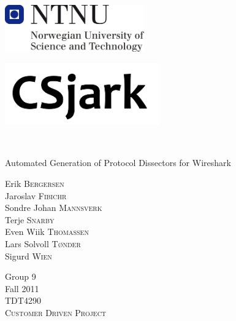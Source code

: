 \begin{titlepage}
\begin{center}

\includegraphics[width=0.45\textwidth]{./img/NTNU-logo.png}\\[6cm]


\begin{flushleft}
\includegraphics[width=0.5\textwidth]{./img/CSjark.png}
\end{flushleft}

\HRule \\[0.2cm]

\begin{flushright}
{ \Large Automated Generation of Protocol Dissectors for Wireshark}\\
\end{flushright}


\vfill

\begin{minipage}{0.45\linewidth}
\begin{flushleft} 
Erik \textsc{Bergersen}\\
Jaroslav \textsc{Fibichr}\\
Sondre Johan \textsc{Mannsverk}\\
Terje \textsc{Snarby}\\
Even Wiik \textsc{Thomassen}\\
Lars Solvoll \textsc{T\o nder}\\
Sigurd \textsc{Wien}
\end{flushleft}
\end{minipage}
\begin{minipage}{0.45\linewidth}
\begin{flushright} 
Group 9\\
Fall 2011\\[1.5cm]
\textsc{TDT4290}\\
\textsc{Customer Driven Project}\\
\end{flushright}
\end{minipage}

\end{center}
\end{titlepage}

